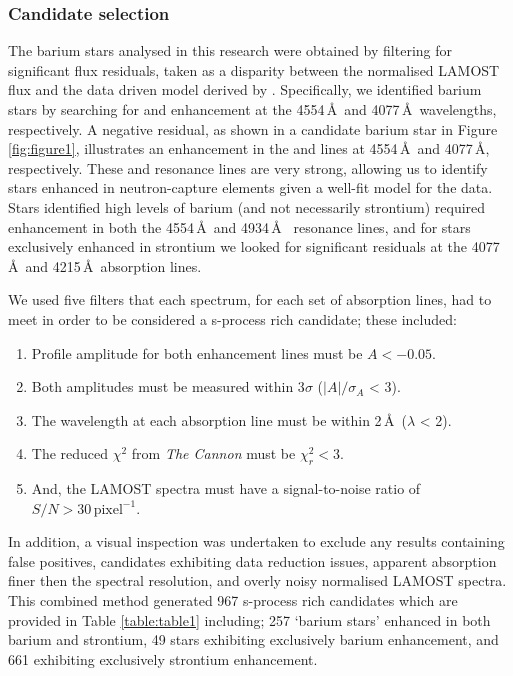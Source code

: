 \documentclass[a4paper,fleqn,usenatbib]{mnras}
\begin{document}
\subsubsection{Candidate selection} \label{sec:cand}
The barium stars analysed in this research were obtained by filtering for significant flux residuals, taken as a disparity between the normalised LAMOST flux and the data driven model derived by \citet{ho2017}. Specifically, we identified barium stars by searching for  and  enhancement at the 4554\,\AA\ and 4077\,\AA\ wavelengths, respectively. A negative residual, as shown in a candidate barium star in Figure \ref{fig:figure1}, illustrates an enhancement in the  and  lines at 4554\,\AA\, and 4077\,\AA, respectively. These  and  resonance lines are very strong, allowing us to identify stars enhanced in neutron-capture elements given a well-fit model for the data. Stars identified high levels of barium (and not necessarily strontium) required enhancement in both the 4554\,\AA\ and 4934\,\AA\  resonance lines, and for stars exclusively enhanced in strontium we looked for significant residuals at the 4077\,\AA\ and 4215\,\AA\ absorption lines.  

We used five filters that each spectrum, for each set of absorption lines, had to meet in order to be considered a s-process rich candidate; these included:

\renewcommand\labelenumi{(\roman{enumi})}
\renewcommand\theenumi\labelenumi

\begin{enumerate} 
\item Profile amplitude for both enhancement lines must be $A < -0.05$.
\item Both amplitudes must be measured within 3$\sigma$ ($|A|/\sigma _A$ < 3).
\item The wavelength at each absorption line must be within 2\,\AA\ ($\lambda$ < 2).
\item The reduced $\chi^2$ from \emph{The Cannon} must be $\chi_r^2 < 3$.
\item And, the LAMOST spectra must have a signal-to-noise ratio of $S/N > 30\,\textrm{pixel}^{-1}$.
\end{enumerate}
In addition, a visual inspection was undertaken to exclude any results containing false positives, candidates exhibiting data reduction issues, apparent absorption finer then the spectral resolution, and overly noisy normalised LAMOST spectra. This combined method generated 967 s-process rich candidates which are provided in Table \ref{table:table1} including; 257 `barium stars' enhanced in both barium and strontium, 49 stars exhibiting exclusively barium enhancement, and 661 exhibiting exclusively strontium enhancement. 
\end{document}
